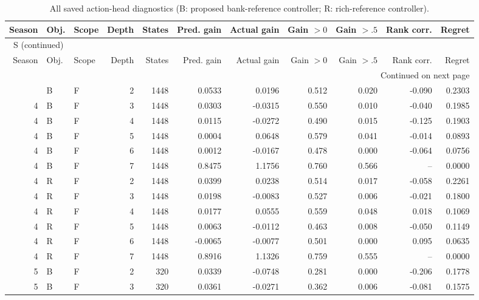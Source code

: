 \documentclass[10pt,a4paper]{article}
\renewcommand{\thetable}{S\arabic{table}}
\begin{document}
\clearpage
\begin{landscape}
\begingroup\footnotesize
\setlength{\tabcolsep}{3.5pt}
\renewcommand{\arraystretch}{1.10}
\begin{longtable}{rllrrrrrrrr}
\caption{All saved action-head diagnostics (B: proposed bank-reference controller; R: rich-reference controller).}\label{tab:action}\\
\toprule
Season & Obj. & Scope & Depth & States & Pred. gain & Actual gain & Gain $>0$ & Gain $>.5$ & Rank corr. & Regret \\
\midrule
\endfirsthead
\multicolumn{11}{l}{\tablename~\thetable{} (continued)}\\
\toprule
Season & Obj. & Scope & Depth & States & Pred. gain & Actual gain & Gain $>0$ & Gain $>.5$ & Rank corr. & Regret \\
\midrule
\endhead
\midrule
\multicolumn{11}{r}{Continued on next page}\\
\endfoot
\bottomrule
\endlastfoot
4 & B & F & 2 & 1448 & 0.0533 & 0.0196 & 0.512 & 0.020 & -0.090 & 0.2303 \\
4 & B & F & 3 & 1448 & 0.0303 & -0.0315 & 0.550 & 0.010 & -0.040 & 0.1985 \\
4 & B & F & 4 & 1448 & 0.0115 & -0.0272 & 0.490 & 0.015 & -0.125 & 0.1903 \\
4 & B & F & 5 & 1448 & 0.0004 & 0.0648 & 0.579 & 0.041 & -0.014 & 0.0893 \\
4 & B & F & 6 & 1448 & 0.0012 & -0.0167 & 0.478 & 0.000 & -0.064 & 0.0756 \\
4 & B & F & 7 & 1448 & 0.8475 & 1.1756 & 0.760 & 0.566 & -- & 0.0000 \\
4 & R & F & 2 & 1448 & 0.0399 & 0.0238 & 0.514 & 0.017 & -0.058 & 0.2261 \\
4 & R & F & 3 & 1448 & 0.0198 & -0.0083 & 0.527 & 0.006 & -0.021 & 0.1800 \\
4 & R & F & 4 & 1448 & 0.0177 & 0.0555 & 0.559 & 0.048 & 0.018 & 0.1069 \\
4 & R & F & 5 & 1448 & 0.0063 & -0.0112 & 0.463 & 0.008 & -0.050 & 0.1149 \\
4 & R & F & 6 & 1448 & -0.0065 & -0.0077 & 0.501 & 0.000 & 0.095 & 0.0635 \\
4 & R & F & 7 & 1448 & 0.8916 & 1.1326 & 0.759 & 0.555 & -- & 0.0000 \\
5 & B & F & 2 & 320 & 0.0339 & -0.0748 & 0.281 & 0.000 & -0.206 & 0.1778 \\
5 & B & F & 3 & 320 & 0.0361 & -0.0271 & 0.362 & 0.006 & -0.081 & 0.1575 \\

\end{longtable}
\end{landscape}
\end{document}
